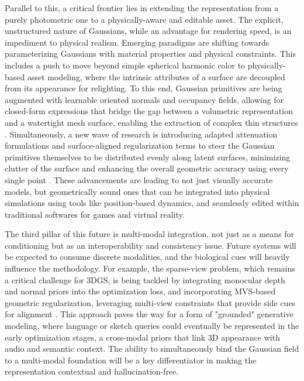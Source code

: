 \documentclass[11pt,a4paper]{article}
\begin{document}
Parallel to this, a critical frontier lies in extending the representation from a purely photometric one to a physically-aware and editable asset. The explicit, unstructured nature of Gaussians, while an advantage for rendering speed, is an impediment to physical realism. Emerging paradigms are shifting towards parameterizing Gaussians with material properties and physical constraints. This includes a push to move beyond simple spherical harmonic color to physically-based asset modeling, where the intrinsic attributes of a surface are decoupled from its appearance for relighting. To this end, Gaussian primitives are being augmented with learnable oriented normals and occupancy fields, allowing for closed-form expressions that bridge the gap between a volumetric representation and a watertight mesh surface, enabling the extraction of complex thin structures \cite{arxiv:2604.07337v1}. Simultaneously, a new wave of research is introducing adapted attenuation formulations and surface-aligned regularization terms to steer the Gaussian primitives themselves to be distributed evenly along latent surfaces, minimizing clutter of the surface and enhancing the overall geometric accuracy using every single point \cite{arxiv:2411.19454v2}. These advancements are leading to not just visually accurate models, but geometrically sound ones that can be integrated into physical simulations using tools like position-based dynamics, and seamlessly edited within traditional softwares for games and virtual reality.

The third pillar of this future is multi-modal integration, not just as a means for conditioning but as an interoperability and consistency issue. Future systems will be expected to consume discrete modalities, and the biological cues will heavily influence the methodology. For example, the sparse-view problem, which remains a critical challenge for 3DGS, is being tackled by integrating monocular depth and normal priors into the optimization loss, and incorporating MVS-based geometric regularization, leveraging multi-view constraints that provide side cues for alignment \cite{arxiv:2411.16898v4,arxiv:2403.17822v1}. This approach paves the way for a form of "grounded" generative modeling, where language or sketch queries could eventually be represented in the early optimization stages, a cross-modal priors that link 3D appearance with audio and semantic context. The ability to simultaneously bind the Gaussian field to a multi-modal foundation will be a key differentiator in making the representation contextual and hallucination-free.
\end{document}
